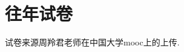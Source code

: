 \documentclass[openany,oneside]{ctexbook}
\newif\ifmainwatermark
\newcommand{\EnableMainWatermark}{\global\mainwatermarktrue}
\newcommand{\DisableMainWatermark}{\global\mainwatermarkfalse}
\begin{document}
\chapter{往年试卷}
试卷来源周羚君老师在中国大学mooc上的上传.
\DisableMainWatermark

\EnableMainWatermark



\nocite{*}

\end{document}
